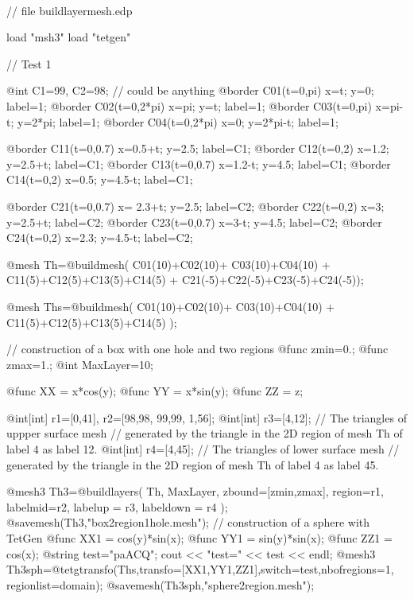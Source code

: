 \documentclass[a4paper,twoside,12pt]{book}
\begin{document}
\begin{example}
\label{buildlayermesh}~
\bFF

// file buildlayermesh.edp

load "msh3"
load "tetgen"


// Test 1

@int C1=99, C2=98; // could be anything
@border C01(t=0,pi){ x=t;  y=0;      label=1;}
@border C02(t=0,2*pi){ x=pi; y=t;  label=1;}
@border C03(t=0,pi){ x=pi-t;  y=2*pi;    label=1;}
@border C04(t=0,2*pi){ x=0;    y=2*pi-t; label=1;}

@border C11(t=0,0.7){ x=0.5+t;  y=2.5;      label=C1;}
@border C12(t=0,2){ x=1.2;    y=2.5+t;  label=C1;}
@border C13(t=0,0.7){ x=1.2-t;  y=4.5;     label=C1;}
@border C14(t=0,2){ x=0.5;    y=4.5-t; label=C1;}

@border C21(t=0,0.7){ x= 2.3+t;     y=2.5;  label=C2;}
@border C22(t=0,2){        x=3;   y=2.5+t;  label=C2;}
@border C23(t=0,0.7){   x=3-t;     y=4.5;  label=C2;}
@border C24(t=0,2){       x=2.3;   y=4.5-t; label=C2;}

@mesh Th=@buildmesh(    C01(10)+C02(10)+ C03(10)+C04(10)
                    + C11(5)+C12(5)+C13(5)+C14(5)
                    + C21(-5)+C22(-5)+C23(-5)+C24(-5));

@mesh Ths=@buildmesh(    C01(10)+C02(10)+ C03(10)+C04(10)
                    + C11(5)+C12(5)+C13(5)+C14(5) );

// construction of a box with one hole and two regions
@func zmin=0.;
@func zmax=1.;
@int MaxLayer=10;

@func XX = x*cos(y);
@func YY = x*sin(y);
@func ZZ = z;

@int[int] r1=[0,41], r2=[98,98,  99,99, 1,56];
@int[int] r3=[4,12];    //  The triangles of uppper surface mesh
// generated by the triangle in the 2D region of mesh Th of label 4 as label 12.
@int[int] r4=[4,45];    //  The triangles of lower surface mesh
// generated by the triangle in the 2D region of mesh Th of label 4 as label 45.

@mesh3 Th3=@buildlayers( Th, MaxLayer, zbound=[zmin,zmax], region=r1,
                labelmid=r2, labelup = r3, labeldown = r4 );
@savemesh(Th3,"box2region1hole.mesh");
// construction of a sphere with TetGen
@func XX1 = cos(y)*sin(x);
@func YY1 = sin(y)*sin(x);
@func ZZ1 = cos(x);
@string test="paACQ";
cout << "test=" << test << endl;
@mesh3 Th3sph=@tetgtransfo(Ths,transfo=[XX1,YY1,ZZ1],switch=test,nbofregions=1,
                           regionlist=domain);
@savemesh(Th3sph,"sphere2region.mesh");

\eFF
\end{example}
\end{document}
